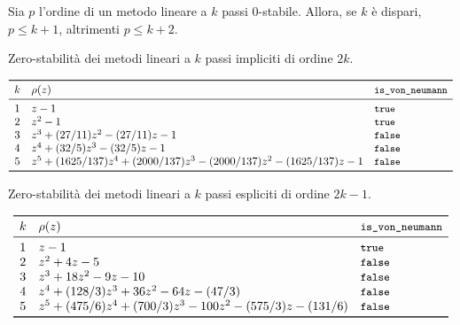 \begin{teor}
Sia $p$ l'ordine di un metodo lineare a $k$ passi 0-stabile.
Allora, se $k$ è dispari, $p \leq k+1$, altrimenti $p \leq k+2$.
\end{teor}



\begin{table}[p]
\caption{Zero-stabilità dei metodi lineari
a $k$ passi impliciti di ordine $2k$.}
\label{tab:lmf-max-order-implicit-0-stability}
\vspace*{-2.5ex}
\begin{equation*}
\begin{array}{cll}
\toprule
k & \rho(z) & \text{\code{is\_von\_neumann}} \\
\midrule
1 & z-1                       & \text{\code{true}}  \\
2 & z^2-1                     & \text{\code{true}}  \\
3 & z^3+(27/11)z^2-(27/11)z-1 & \text{\code{false}} \\
4 & z^4+(32/5)z^3-(32/5)z-1   & \text{\code{false}} \\
5 & z^5+(1625/137)z^4+(2000/137)z^3-(2000/137)z^2-(1625/137)z-1 & \text{\code{false}} \\
\bottomrule
\end{array}
\end{equation*}
\end{table}

\begin{table}[p]
\caption{Zero-stabilità dei metodi lineari
a $k$ passi espliciti di ordine $2k-1$.}
\label{tab:lmf-max-order-explicit-0-stability}
\begin{equation*}
\begin{array}{cll}
\toprule
k & \rho(z) & \text{\code{is\_von\_neumann}} \\
\midrule
1 & z-1                             & \text{\code{true}}  \\
2 & z^2+4z-5                        & \text{\code{false}} \\
3 & z^3+18z^2-9z-10                 & \text{\code{false}} \\
4 & z^4+(128/3)z^3+36z^2-64z-(47/3) & \text{\code{false}} \\
5 & z^5+(475/6)z^4+(700/3)z^3-100z^2-(575/3)z-(131/6) & \text{\code{false}} \\
\bottomrule
\end{array}
\end{equation*}
\end{table}

